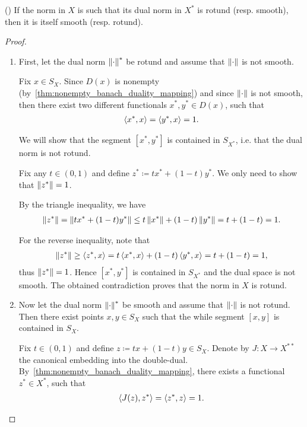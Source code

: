 \begin{theorem}\label{thm:smooth_rotund_norm_duality}(\cite[exercise 2.37(a)]{Phelps1993})
  If the norm in $X$ is such that its dual norm in $X^*$ is rotund (resp. smooth), then it is itself smooth (resp. rotund).
\end{theorem}
\begin{proof}
  \begin{enumerate}
    \item First, let the dual norm $\left\Vert \cdot \right\Vert^*$ be rotund and assume that $\left\Vert \cdot \right\Vert$ is not smooth.

    Fix $x \in S_X$. Since $D(x)$ is nonempty (by~\cref{thm:nonempty_banach_duality_mapping}) and since $\left\Vert \cdot \right\Vert$ is not smooth, then there exist two different functionals $x^*, y^* \in D(x)$, such that
    \begin{align*}
      \left\langle x^*, x \right\rangle
      =
      \left\langle y^*, x \right\rangle
      =
      1.
    \end{align*}

    We will show that the segment $[x^*, y^*]$ is contained in $S_{X^*}$, i.e. that the dual norm is not rotund.

    Fix any $t \in (0, 1)$ and define $z^* \coloneqq t x^* + (1-t) y^*$. We only need to show that $\left\Vert z^* \right\Vert = 1$.

    By the triangle inequality, we have
    \begin{align*}
      \left\Vert z^* \right\Vert
      =
      \left\Vert t x^* + (1-t) y^* \right\Vert
      \leq
      t \left\Vert x^* \right\Vert + (1-t) \left\Vert y^* \right\Vert
      =
      t + (1-t)
      =
      1.
    \end{align*}

    For the reverse inequality, note that
    \begin{align*}
      \left\Vert z^* \right\Vert
      \geq
      \left\langle z^*, x \right\rangle
      =
      t \left\langle x^*, x \right\rangle + (1-t) \left\langle y^*, x \right\rangle
      =
      t + (1-t)
      =
      1,
    \end{align*}
    thus $\left\Vert z^* \right\Vert = 1$. Hence $[x^*, y^*]$ is contained in $S_{X^*}$ and the dual space is not smooth. The obtained contradiction proves that the norm in $X$ is rotund.

    \item Now let the dual norm $\left\Vert \cdot \right\Vert^*$ be smooth and assume that $\left\Vert \cdot \right\Vert$ is not rotund. Then there exist points $x, y \in S_X$ such that the while segment $[x, y]$ is contained in $S_X$.

    Fix $t \in (0, 1)$ and define $z \coloneqq tx + (1-t)y \in S_X$. Denote by $J: X \to X^{**}$ the canonical embedding into the double-dual. By~\cref{thm:nonempty_banach_duality_mapping}, there exists a functional $z^* \in X^*$, such that
    \begin{align*}
      \left\langle J(z), z^* \right\rangle
      =
      \left\langle z^*, z \right\rangle
      =
      1.
    \end{align*}


\end{enumerate}
\end{proof}

